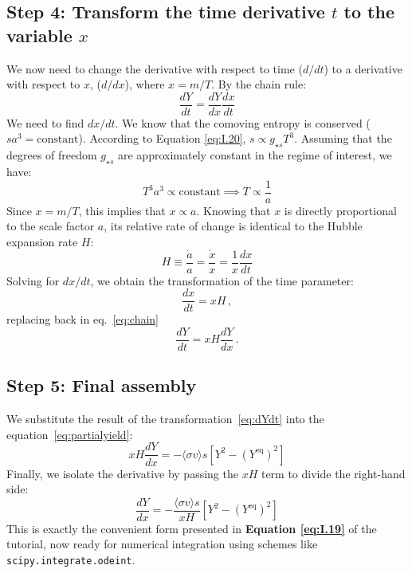 \documentclass[11pt,a4paper]{article}
\begin{document}
\subsection*{Step 4: Transform the time derivative $t$ to the variable $x$}
We now need to change the derivative with respect to time ($d/{dt}$) to a derivative with respect to $x$, (${d}/{dx}$), where \textbf{$x = m/T$}.
By the chain rule:
\begin{equation} \label{eq:chain}
    \frac{dY}{dt} = \frac{dY}{dx} \frac{dx}{dt}
\end{equation}
We need to find ${dx}/{dt}$. We know that the comoving entropy is conserved ($s a^3 = \text{constant}$). According to Equation \eqref{eq:I.20}, $s \propto g_{\star s} T^3$. Assuming that the degrees of freedom $g_{\star s}$ are approximately constant in the regime of interest, we have:
\begin{equation}
    T^3 a^3 \propto \text{constant} \implies T \propto \frac{1}{a}
\end{equation}
Since $x = m/T$, this implies that $x \propto a$. Knowing that $x$ is directly proportional to the scale factor $a$, its relative rate of change is identical to the Hubble expansion rate $H$:
\begin{equation}
    H \equiv \frac{\dot{a}}{a} = \frac{\dot{x}}{x} = \frac{1}{x} \frac{dx}{dt}
\end{equation}
Solving for ${dx}/{dt}$, we obtain the transformation of the time parameter:
\begin{equation}
    \frac{dx}{dt} = x H\,,
\end{equation}
replacing back in eq.~\eqref{eq:chain}
\begin{equation}
\label{eq:dYdt}
    \frac{dY}{dt} = xH \frac{dY}{dx}\,.
\end{equation}

\subsection*{Step 5: Final assembly}
We substitute the result of the transformation~\eqref{eq:dYdt} into the equation~\eqref{eq:partialyield}:
\begin{equation}
    x H \frac{dY}{dx} = -\langle\sigma v\rangle s \left[ Y^2 - (Y^{\text{eq}})^2 \right]
\end{equation}
Finally, we isolate the derivative by passing the $x H$ term to divide the right-hand side:
\begin{equation}
    \frac{dY}{dx} = -\frac{\langle\sigma v\rangle s}{x H} \left[ Y^2 - (Y^{\text{eq}})^2 \right]
\end{equation}
This is exactly the convenient form presented in \textbf{Equation \eqref{eq:I.19}} of the tutorial, now ready for numerical integration using schemes like \texttt{scipy.integrate.odeint}.
\end{document}
